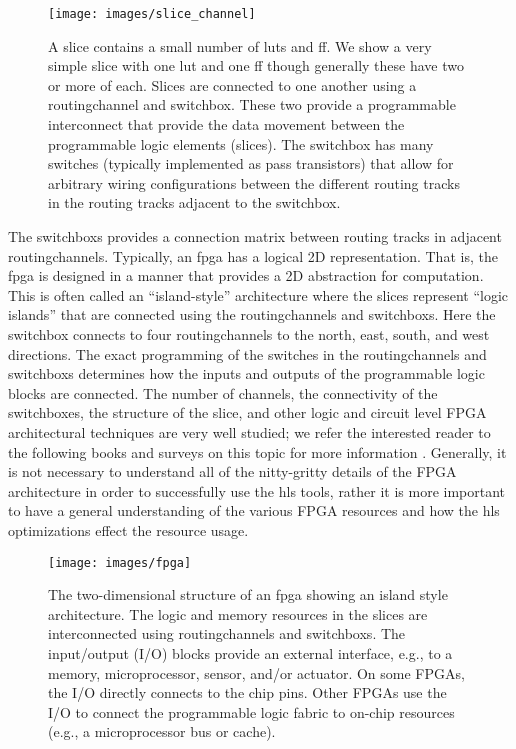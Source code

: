 \begin{figure}
\centering
\texttt{[image: images/slice\_channel]}
\caption{ A \gls{slice} contains a small number of \glspl{lut} and \gls{ff}. We show a very simple \gls{slice} with one \gls{lut} and one \gls{ff} though generally these have two or more of each. Slices are connected to one another using a \gls{routingchannel} and \gls{switchbox}. These two provide a programmable interconnect that provide the data movement between the programmable logic elements (\glspl{slice}). The \gls{switchbox} has many switches (typically implemented as pass transistors) that allow for arbitrary wiring configurations between the different routing tracks in the routing tracks adjacent to the switchbox. }
\label{fig:slice_channel}
\end{figure}

The \glspl{switchbox} provides a connection matrix between routing tracks in adjacent \glspl{routingchannel}. Typically, an \gls{fpga} has a logical 2D representation. That is, the \gls{fpga} is designed in a manner that provides a 2D abstraction for computation. This is often called an ``island-style'' architecture where the \glspl{slice} represent ``logic islands'' that are connected using the \glspl{routingchannel} and \glspl{switchbox}. Here the \gls{switchbox} connects to four \glspl{routingchannel} to the north, east, south, and west directions. The exact programming of the switches in the \glspl{routingchannel} and \glspl{switchbox} determines how the inputs and outputs of the programmable logic blocks are connected. The number of channels, the connectivity of the switchboxes, the structure of the slice, and other logic and circuit level FPGA architectural techniques are very well studied; we refer the interested reader to the following books and surveys on this topic for more information \cite{brown1996fpga, betz1997vpr, hauck2010reconfigurable}. Generally, it is not necessary to understand all of the nitty-gritty details of the FPGA architecture in order to successfully use the \gls{hls} tools, rather it is more important to have a general understanding of the various FPGA resources and how the \gls{hls} optimizations effect the resource usage.

\begin{figure}
\centering
\texttt{[image: images/fpga]}
\caption{ The two-dimensional structure of an \gls{fpga} showing an island style architecture. The logic and memory resources in the \glspl{slice} are interconnected using \glspl{routingchannel} and \glspl{switchbox}. The input/output (I/O) blocks provide an external interface, e.g., to a memory, microprocessor, sensor, and/or actuator. On some FPGAs, the I/O directly connects to the chip pins. Other FPGAs use the I/O to connect the programmable logic fabric to on-chip resources (e.g., a microprocessor bus or cache).   }
\label{fig:fpga}
\end{figure}

